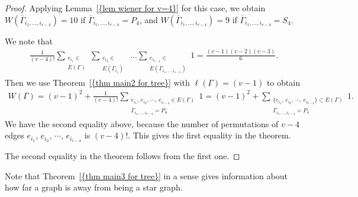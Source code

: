 \documentclass[12pt]{amsart}
\theoremstyle{example}
\theoremstyle{definition}
\theoremstyle{notation}
\begin{document}
\begin{proof}
Applying {Lemma~\ref{{lem wiener for v=4}}} for this case, we obtain $W({{\overline{\Gamma}}}_{i_1,\dots, i_{v-4}})=10$ if ${{\overline{\Gamma}}}_{i_1,\dots, i_{v-4}}=P_4$, and $W({{\overline{\Gamma}}}_{i_1,\dots, i_{v-4}})=9$ if ${{\overline{\Gamma}}}_{i_1,\dots, i_{v-4}}=S_4$.

We note that
\begin{equation*}
\begin{split}
\frac{1}{(v-4)!} \sum_{\substack{e_{i_1} \in
\\ {E({\Gamma})}}} \sum_{\substack{e_{i_2} \in
\\ {E({{{\overline{\Gamma}}}_{i_1}})}}}
\; \dots
\sum_{ \substack{e_{i_{v-4}} \in
\\ {E({{{\overline{\Gamma}}}_{i_1, \dots, i_{v-5}}})}} }
1 = \frac{(v-1)(v-2)(v-3)}{6}.
\end{split}
\end{equation*}
Then we use {Theorem~\ref{{thm main2 for tree}}} with ${\ell ({\Gamma})}=(v-1)$ to obtain
\begin{equation*}
\begin{split}
W({\Gamma}) = (v-1)^2+\frac{1}{(v-4)!}\sum_{\substack{e_{i_1}, \, e_{i_2}, \, \cdots, \,  e_{i_{v-4}} \in {E({\Gamma})} \\
{{\overline{\Gamma}}}_{i_1,\dots, i_{v-4}}=P_4}} 1 = (v-1)^2+\sum_{\substack{\{ e_{i_1}, \, e_{i_2}, \, \cdots, \,  e_{i_{v-4}} \} \subset {E({\Gamma})} \\
{{\overline{\Gamma}}}_{i_1,\dots, i_{v-4}}=P_4}} 1 .
\end{split}
\end{equation*}
We have the second equality above, because the number of permutations of $v-4$ edges $e_{i_1}, \, e_{i_2}, \, \cdots, \,  e_{i_{v-4}}$ is $(v-4)!$.
This gives the first equality in the theorem.

The second equality in the theorem follows from the first one.
\end{proof}
Note that {Theorem~\ref{{thm main3 for tree}}} in a sense gives information about how far a graph is away from being a star graph.
\end{document}
